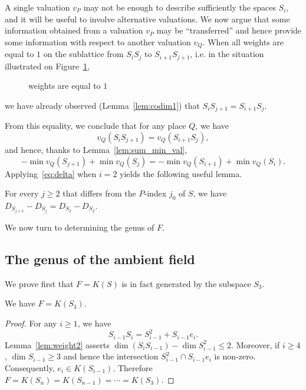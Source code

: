\documentclass[ALCO,Unicode,ThmDefs]{cedram}
\renewcommand{\geq}{\geqslant}
\renewcommand{\leq}{\leqslant}
\begin{document}
A single valuation $v_P$ may not be enough to describe sufficiently the spaces $S_i$, and it will be useful to involve alternative valuations. We now argue that some information obtained from a valuation $v_P$ may be ``transferred'' and hence provide some information with respect to another valuation $v_Q$. When all weights are equal to $1$ on the sublattice from $S_iS_j$ to $S_{i+1}S_{j+1}$, i.e. in the situation illustrated on Figure~\ref{fig:square},
\begin{figure}[h]
\centering
{}
\caption{weights are equal to $1$}\label{fig:square}
\end{figure}
we have already observed (Lemma~\ref{lem:codim1}) that $S_{i}S_{j+1}=S_{i+1}S_{j}$.

From this equality, we conclude that for any place $Q$, we have
\[
v_Q(S_{i}S_{j+1})=v_Q(S_{i+1}S_{j}),
\]
and hence, thanks to Lemma~\ref{lem:sum_min_val},
\begin{equation}\label{eq:delta}
-\min v_Q(S_{j+1})+\min v_Q(S_j)=-\min v_Q(S_{i+1})+\min v_Q(S_i).
\end{equation}
Applying~\eqref{eq:delta} when $i=2$ yields the following useful lemma.

\begin{lemm}\label{lem:D_Si}
For every $j\geq2$ that differs from the $P$-index $j_0$ of $S$, we have $D_{S_{j+1}}-D_{S_j}=D_{S_3}-D_{S_2}$.
\end{lemm}

We now turn to determining the genus of $F$.

\subsection{The genus of the ambient field}\label{sec:genus}

We prove first that $F=K(S)$ is in fact generated by the subspace $S_3$.

\begin{lemm}\label{lem:dimSiSi+1}
We have $F= K(S_3)$.
\end{lemm}

\begin{proof}
For any $i\geq1$, we have
\[
S_{i-1} S_i= S_{i-1}^2 + S_{i-1} e_i.
\]
Lemma~\ref{lem:weight2} asserts $\dim (S_iS_{i-1}) - \dim S_{i-1}^2\leq2$. Moreover, if $i\geq4$, $\dim S_{i-1}\geq3$ and hence the intersection $S_{i-1}^2 \cap S_{i-1}e_i$ is non-zero. Consequently, $e_i \in K(S_{i-1})$. Therefore $F=K(S_n)=K(S_{n-1})=\cdots=K(S_3)$.
\end{proof}
\end{document}
